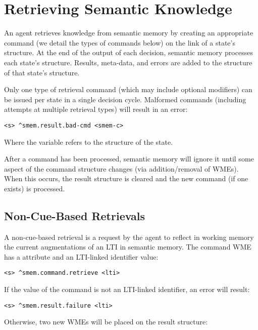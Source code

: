 \section{Retrieving Semantic Knowledge}
\label{SMEM-retrieve}

An agent retrieves knowledge from semantic memory by creating an appropriate command (we detail the types of commands below) on the  link of a state's  structure.
At the end of the output of each decision, semantic memory processes each state's  structure.
Results, meta-data, and errors are added to the  structure of that state's  structure.

Only one type of retrieval command (which may include optional modifiers) can be issued per state in a single decision cycle.
Malformed commands (including attempts at multiple retrieval types) will result in an error:

\begin{verbatim}
<s> ^smem.result.bad-cmd <smem-c>
\end{verbatim}

Where the  variable refers to the  structure of the state.

After a command has been processed, semantic memory will ignore it until some aspect of the command structure changes (via addition/removal of WMEs).
When this occurs, the result structure is cleared and the new command (if one exists) is processed.

\subsection{Non-Cue-Based Retrievals}
A non-cue-based retrieval is a request by the agent to reflect in working memory the current augmentations of an LTI in semantic memory.
The command WME has a  attribute and an LTI-linked identifier value:

\begin{verbatim}
<s> ^smem.command.retrieve <lti>
\end{verbatim}

If the value of the command is not an LTI-linked identifier, an error will result:

\begin{verbatim}
<s> ^smem.result.failure <lti>
\end{verbatim}

Otherwise, two new WMEs will be placed on the result structure:

